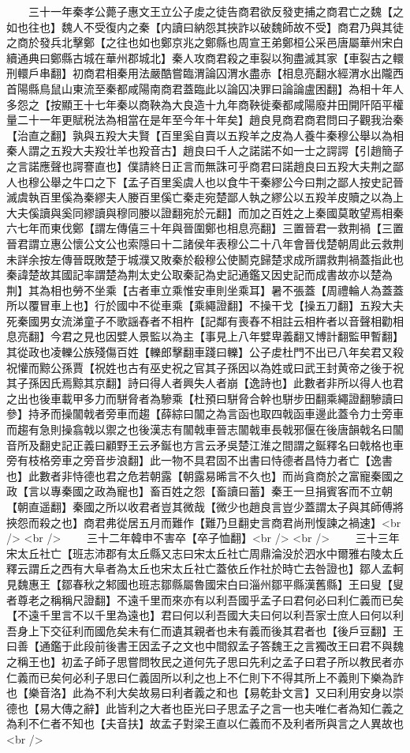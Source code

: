　　三十一年秦孝公薨子惠文王立公子䖍之徒告商君欲反發吏捕之商君亡之魏【之如也往也】魏人不受復内之秦【内讀曰納怨其挾詐以破魏師故不受】商君乃與其徒之商於發兵北擊鄭【之往也如也鄭京兆之鄭縣也周宣王弟鄭桓公采邑唐屬華州宋白續通典曰鄭縣古城在華州郡城北】秦人攻商君殺之車裂以狥盡滅其家【車裂古之轘刑轘戶串翻】初商君相秦用法嚴酷嘗臨渭論囚渭水盡赤【相息亮翻水經渭水出隴西首陽縣鳥鼠山東流至秦都咸陽南商君蓋臨此以論囚决罪曰論論盧困翻】為相十年人多怨之【按顯王十七年秦以商鞅為大良造十九年商鞅徙秦都咸陽廢井田開阡陌平權量二十一年更賦税法為相當在是年至今年十年矣】趙良見商君商君問曰子觀我治秦【治直之翻】孰與五羖大夫賢【百里奚自賣以五羖羊之皮為人養牛秦穆公舉以為相秦人謂之五羖大夫羖壮羊也羖音古】趙良曰千人之諾諾不如一士之諤諤【引趙簡子之言諾應聲也諤謇直也】僕請終日正言而無誅可乎商君曰諾趙良曰五羖大夫荆之鄙人也穆公舉之牛口之下【孟子百里奚虞人也以食牛干秦繆公今曰荆之鄙人按史記晉滅虞執百里傒為秦繆夫人媵百里傒亡秦走宛楚鄙人執之繆公以五羖羊皮贖之以為上大夫傒讀與奚同繆讀與穆同媵以證翻宛於元翻】而加之百姓之上秦國莫敢望焉相秦六七年而東伐鄭【謂左傳僖三十年與晉圍鄭也相息亮翻】三置晉君一救荆禍【三置晉君謂立惠公懷公文公也索隱曰十二諸侯年表穆公二十八年會晉伐楚朝周此云救荆未詳余按左傳晉既敗楚于城濮又敗秦於殽穆公使鬭克歸楚求成所謂救荆禍蓋指此也秦諱楚故其國記率謂楚為荆太史公取秦記為史記通鑑又因史記而成書故亦以楚為荆】其為相也勞不坐乘【古者車立乘惟安車則坐乘耳】暑不張蓋【周禮輪人為蓋蓋所以覆冒車上也】行於國中不從車乘【乘繩證翻】不操干戈【操五刀翻】五羖大夫死秦國男女流涕童子不歌謡舂者不相杵【記鄰有喪舂不相註云相杵者以音聲相勸相息亮翻】今君之見也因嬖人景監以為主【事見上八年嬖卑義翻又博計翻監甲暫翻】其從政也凌轢公族殘傷百姓【轢郎擊翻車踐曰轢】公子䖍杜門不出已八年矣君又殺祝懽而黥公孫賈【祝姓也古有巫史祝之官其子孫因以為姓或曰武王封黄帝之後于祝其子孫因氏焉黥其京翻】詩曰得人者興失人者崩【逸詩也】此數者非所以得人也君之出也後車載甲多力而駢脅者為驂乘【杜預曰駢脅合幹也駢步田翻乘繩證翻驂讀曰參】持矛而操闟戟者旁車而趨【薛綜曰闟之為言函也取四戟函車邊此蓋令力士旁車而趨有急則操翕戟以禦之也後漢志有闟戟車晉志闟戟車長戟邪偃在後唐韻戟名曰闟音所及翻史記正義曰顧野王云矛鋋也方言云矛吳楚江淮之間謂之鋋釋名曰戟格也車旁有枝格旁車之旁音步浪翻】此一物不具君固不出書曰恃德者昌恃力者亡【逸書也】此數者非恃德也君之危若朝露【朝露易晞言不久也】而尚貪商於之富寵秦國之政【言以專秦國之政為寵也】畜百姓之怨【畜讀曰蓄】秦王一旦捐賓客而不立朝【朝直遥翻】秦國之所以收君者豈其微哉【微少也趙良言豈少蓋謂太子與其師傅將挾怨而殺之也】商君弗從居五月而難作【難乃旦翻史言商君尚刑愎諫之禍速】<br />
<br />
　　三十二年韓申不害卒【卒子恤翻】<br />
<br />
　　三十三年宋太丘社亡【班志沛郡有太丘縣又志曰宋太丘社亡周鼎淪没於泗水中爾雅右陵太丘釋云謂丘之西有大阜者為太丘也宋太丘社亡蓋依丘作社於時亡去咎證也】鄒人孟軻見魏惠王【鄒春秋之邾國也班志鄒縣屬魯國宋白曰淄州鄒平縣漢舊縣】王曰叟【叟者尊老之稱稱尺證翻】不遠千里而來亦有以利吾國乎孟子曰君何必曰利仁義而已矣【不遠千里言不以千里為遠也】君曰何以利吾國大夫曰何以利吾家士庶人曰何以利吾身上下交征利而國危矣未有仁而遺其親者也未有義而後其君者也【後戶豆翻】王曰善【通鑑于此段前後書王因孟子之文也中間叙孟子答魏王之言獨改王曰君不與魏之稱王也】初孟子師子思嘗問牧民之道何先子思曰先利之孟子曰君子所以教民者亦仁義而已矣何必利子思曰仁義固所以利之也上不仁則下不得其所上不義則下樂為詐也【樂音洛】此為不利大矣故易曰利者義之和也【易乾卦文言】又曰利用安身以崇德也【易大傳之辭】此皆利之大者也臣光曰子思孟子之言一也夫唯仁者為知仁義之為利不仁者不知也【夫音扶】故孟子對梁王直以仁義而不及利者所與言之人異故也<br />
